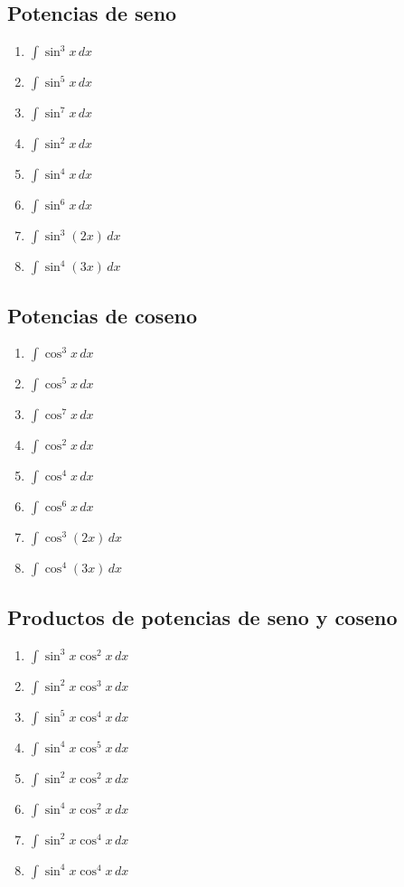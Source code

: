 \documentclass[12pt]{article}
\theoremstyle{definition}
\theoremstyle{remark}
\begin{document}
\subsection{Potencias de seno}
\begin{enumerate}[label=\arabic*.,start=137]
\item $\displaystyle \int \sin^3 x\,dx$
\item $\displaystyle \int \sin^5 x\,dx$
\item $\displaystyle \int \sin^7 x\,dx$
\item $\displaystyle \int \sin^2 x\,dx$
\item $\displaystyle \int \sin^4 x\,dx$
\item $\displaystyle \int \sin^6 x\,dx$
\item $\displaystyle \int \sin^3(2x)\,dx$
\item $\displaystyle \int \sin^4(3x)\,dx$
\end{enumerate}

\subsection{Potencias de coseno}
\begin{enumerate}[label=\arabic*.,start=145]
\item $\displaystyle \int \cos^3 x\,dx$
\item $\displaystyle \int \cos^5 x\,dx$
\item $\displaystyle \int \cos^7 x\,dx$
\item $\displaystyle \int \cos^2 x\,dx$
\item $\displaystyle \int \cos^4 x\,dx$
\item $\displaystyle \int \cos^6 x\,dx$
\item $\displaystyle \int \cos^3(2x)\,dx$
\item $\displaystyle \int \cos^4(3x)\,dx$
\end{enumerate}

\subsection{Productos de potencias de seno y coseno}
\begin{enumerate}[label=\arabic*.,start=153]
\item $\displaystyle \int \sin^3 x\cos^2 x\,dx$
\item $\displaystyle \int \sin^2 x\cos^3 x\,dx$
\item $\displaystyle \int \sin^5 x\cos^4 x\,dx$
\item $\displaystyle \int \sin^4 x\cos^5 x\,dx$
\item $\displaystyle \int \sin^2 x\cos^2 x\,dx$
\item $\displaystyle \int \sin^4 x\cos^2 x\,dx$
\item $\displaystyle \int \sin^2 x\cos^4 x\,dx$
\item $\displaystyle \int \sin^4 x\cos^4 x\,dx$
\end{enumerate}
\end{document}
